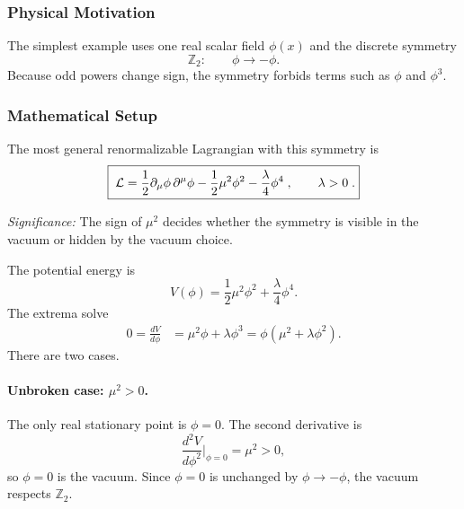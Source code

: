 \subsubsection*{Physical Motivation}

The simplest example uses one real scalar field $\phi(x)$ and the discrete symmetry
\begin{equation}
  \mathbb Z_2:\qquad \phi\to-\phi .
  \label{eq:lec15:z2_transformation}
\end{equation}
Because odd powers change sign, the symmetry forbids terms such as $\phi$ and $\phi^3$.

\subsubsection*{Mathematical Setup}

The most general renormalizable Lagrangian with this symmetry is
\begin{equation}
  \boxed{\;\mathcal{L}
  =\frac12\partial_\mu\phi\,\partial^\mu\phi
   -\frac12\mu^2\phi^2
   -\frac{\lambda}{4}\phi^4\; ,\qquad \lambda>0\; .}
  \label{eq:lec15:z2_lagrangian}
\end{equation}

\textit{Significance:} The sign of $\mu^2$ decides whether the symmetry is visible in the vacuum or hidden by the vacuum choice.

The potential energy is
\begin{equation}
  V(\phi)=\frac12\mu^2\phi^2+\frac{\lambda}{4}\phi^4 .
  \label{eq:lec15:z2_potential}
\end{equation}
The extrema solve
\begin{align}
  0=\frac{dV}{d\phi}
  &=\mu^2\phi+\lambda\phi^3
    =\phi(\mu^2+\lambda\phi^2).
  \label{eq:lec15:z2_stationary_condition}
\end{align}
There are two cases.

\paragraph{Unbroken case: $\mu^2>0$.}
The only real stationary point is $\phi=0$. The second derivative is
\begin{equation}
  \frac{d^2V}{d\phi^2}\bigg|_{\phi=0}=\mu^2>0,
  \label{eq:lec15:z2_unbroken_second_derivative}
\end{equation}
so $\phi=0$ is the vacuum. Since $\phi=0$ is unchanged by $\phi\to-\phi$, the vacuum respects $\mathbb Z_2$.

